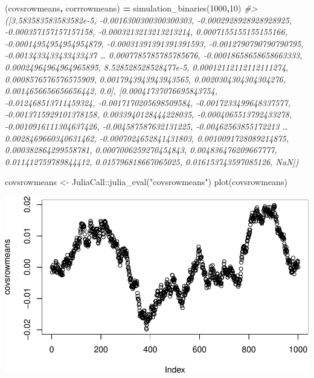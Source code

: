 \documentclass[
]{article}
\newenvironment{Shaded}{\begin{snugshade}}{\end{snugshade}}
\newcommand{\CommentTok}[1]{\textcolor[rgb]{0.56,0.35,0.01}{\textit{#1}}}
\newcommand{\FloatTok}[1]{\textcolor[rgb]{0.00,0.00,0.81}{#1}}
\newcommand{\FunctionTok}[1]{\textcolor[rgb]{0.00,0.00,0.00}{#1}}
\newcommand{\NormalTok}[1]{#1}
\newcommand{\OperatorTok}[1]{\textcolor[rgb]{0.81,0.36,0.00}{\textbf{#1}}}
\newcommand{\OtherTok}[1]{\textcolor[rgb]{0.56,0.35,0.01}{#1}}
\newcommand{\SpecialCharTok}[1]{\textcolor[rgb]{0.00,0.00,0.00}{#1}}
\newcommand{\StringTok}[1]{\textcolor[rgb]{0.31,0.60,0.02}{#1}}
\begin{document}
\begin{Shaded}
\begin{Highlighting}[]
\NormalTok{(covsrowmeans}\OperatorTok{,}\NormalTok{ corrrowmeans) }\OperatorTok{=}\NormalTok{ simulation\_binaries(}\FloatTok{1000}\OperatorTok{,}\FloatTok{10}\NormalTok{)}
\CommentTok{\#\textgreater{} ([3.583583583583582e{-}5, {-}0.0016300300300300303, {-}0.0002928928928928925, {-}0.000357157157157158, {-}0.0003213213213213214, 0.0007155155155155166, {-}0.00014954954954954879, {-}0.00031391391391391593, {-}0.0012790790790790795, {-}0.0013433433433433437  …  0.0007785785785785676, {-}0.00018658658658663333, 0.00024964964964965895, 8.528528528528477e{-}5, 0.00012112112112111274, 0.0008576576576575909, 0.0017943943943943565, 0.0020304304304304276, 0.0014656656656656442, 0.0], [0.00041737076695843754, {-}0.012468513711459324, {-}0.0017170205698509584, {-}0.0017233499648337577, {-}0.0013715929101378158, 0.0033940128444228035, {-}0.0004065513792433278, {-}0.0010916111304637426, {-}0.004587587632131225, {-}0.00462563855172213  …  0.0028469660340631462, {-}0.0007024652841431803, 0.0010091728089214875, 0.000382864299558781, 0.0007006259270454843, 0.004836476209667777, 0.011412759789844412, 0.015796818667065025, 0.016153743597085126, NaN])}
\end{Highlighting}
\end{Shaded}

\begin{Shaded}
\begin{Highlighting}[]
\NormalTok{covsrowmeans }\OtherTok{\textless{}{-}}\NormalTok{ JuliaCall}\SpecialCharTok{::}\FunctionTok{julia\_eval}\NormalTok{(}\StringTok{"covsrowmeans"}\NormalTok{)}
\FunctionTok{plot}\NormalTok{(covsrowmeans)}
\end{Highlighting}
\end{Shaded}

\includegraphics{./figures/unnamed-chunk-12-1.pdf}
\end{document}
